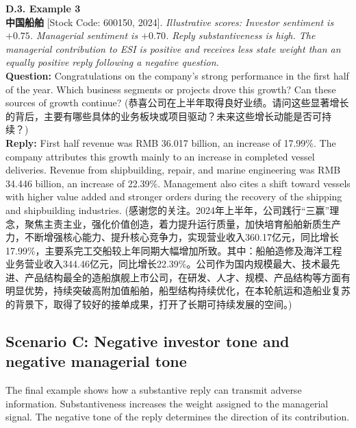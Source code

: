 \noindent \textbf{D.3. Example 3} \\
\textbf{中国船舶} [Stock Code: 600150, 2024]. \textit{Illustrative scores: Investor sentiment is $+0.75$. Managerial sentiment is $+0.70$. Reply substantiveness is high. The managerial contribution to ESI is positive and receives less state weight than an equally positive reply following a negative question.} \\
\textbf{Question:} Congratulations on the company's strong performance in the first half of the year. Which business segments or projects drove this growth? Can these sources of growth continue? (恭喜公司在上半年取得良好业绩。请问这些显著增长的背后，主要有哪些具体的业务板块或项目驱动？未来这些增长动能是否可持续？) \\
\textbf{Reply:} First half revenue was RMB 36.017 billion, an increase of 17.99\%. The company attributes this growth mainly to an increase in completed vessel deliveries. Revenue from shipbuilding, repair, and marine engineering was RMB 34.446 billion, an increase of 22.39\%. Management also cites a shift toward vessels with higher value added and stronger orders during the recovery of the shipping and shipbuilding industries. (感谢您的关注。2024年上半年，公司践行“三赢”理念，聚焦主责主业，强化价值创造，着力提升运行质量，加快培育船舶新质生产力，不断增强核心能力、提升核心竞争力，实现营业收入360.17亿元，同比增长17.99\%，主要系完工交船较上年同期大幅增加所致。其中：船舶造修及海洋工程业务营业收入344.46亿元，同比增长22.39\%。公司作为国内规模最大、技术最先进、产品结构最全的造船旗舰上市公司，在研发、人才、规模、产品结构等方面有明显优势，持续突破高附加值船舶，船型结构持续优化，在本轮航运和造船业复苏的背景下，取得了较好的接单成果，打开了长期可持续发展的空间。)

\subsection{Scenario C: Negative investor tone and negative managerial tone}

The final example shows how a substantive reply can transmit adverse information. Substantiveness increases the weight assigned to the managerial signal. The negative tone of the reply determines the direction of its contribution.

